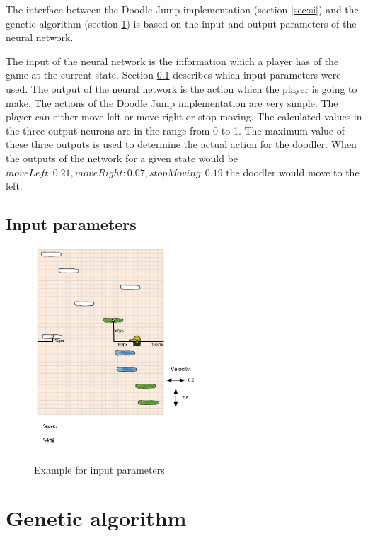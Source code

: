 \documentclass[a4paper,12pt,pagesize,headsepline,bibtotoc,titlepage,abstracton]{scrartcl}
\begin{document}
The interface between the Doodle Jump implementation (section \ref{sec:si}) and the genetic algorithm (section \ref{sec:ga}) is based on the input and output parameters of the neural network.

The input of the neural network is the information which a player has of the game at the current state. Section \ref{sec:ip} describes which input parameters were used. The output of the neural network is the action which the player is going to make. The actions of the Doodle Jump implementation are very simple. The player can either move left or move right or stop moving. The calculated values in the three output neurons are in the range from 0 to 1. The maximum value of these three outputs is used to determine the actual action for the doodler. When the outputs of the network for a given state would be $moveLeft: 0.21, moveRight: 0.07, stopMoving: 0.19$ the doodler would move to the left.

\subsection{Input parameters}
\label{sec:ip}

\begin{figure}[h]
\begin{center}
\includegraphics*[width=0.55\textwidth]{images/input}\\
\caption{Example for input parameters}
\label{abb:ip}
\end{center}
\end{figure}

\section{Genetic algorithm}
\label{sec:ga}
\end{document}

